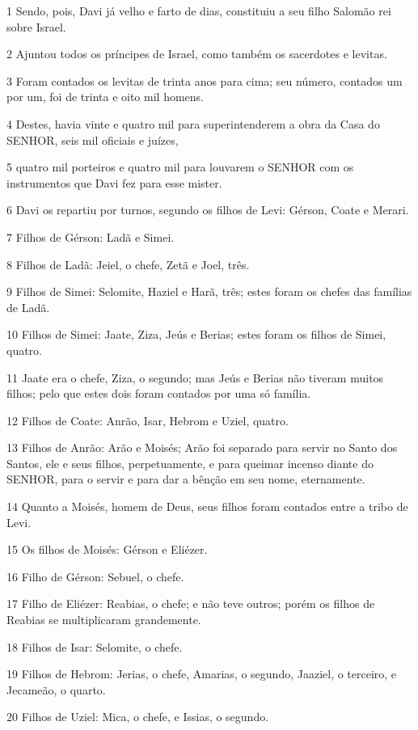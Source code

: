 \par 1 Sendo, pois, Davi já velho e farto de dias, constituiu a seu filho Salomão rei sobre Israel.
\par 2 Ajuntou todos os príncipes de Israel, como também os sacerdotes e levitas.
\par 3 Foram contados os levitas de trinta anos para cima; seu número, contados um por um, foi de trinta e oito mil homens.
\par 4 Destes, havia vinte e quatro mil para superintenderem a obra da Casa do SENHOR, seis mil oficiais e juízes,
\par 5 quatro mil porteiros e quatro mil para louvarem o SENHOR com os instrumentos que Davi fez para esse mister.
\par 6 Davi os repartiu por turnos, segundo os filhos de Levi: Gérson, Coate e Merari.
\par 7 Filhos de Gérson: Ladã e Simei.
\par 8 Filhos de Ladã: Jeiel, o chefe, Zetã e Joel, três.
\par 9 Filhos de Simei: Selomite, Haziel e Harã, três; estes foram os chefes das famílias de Ladã.
\par 10 Filhos de Simei: Jaate, Ziza, Jeús e Berias; estes foram os filhos de Simei, quatro.
\par 11 Jaate era o chefe, Ziza, o segundo; mas Jeús e Berias não tiveram muitos filhos; pelo que estes dois foram contados por uma só família.
\par 12 Filhos de Coate: Anrão, Isar, Hebrom e Uziel, quatro.
\par 13 Filhos de Anrão: Arão e Moisés; Arão foi separado para servir no Santo dos Santos, ele e seus filhos, perpetuamente, e para queimar incenso diante do SENHOR, para o servir e para dar a bênção em seu nome, eternamente.
\par 14 Quanto a Moisés, homem de Deus, seus filhos foram contados entre a tribo de Levi.
\par 15 Os filhos de Moisés: Gérson e Eliézer.
\par 16 Filho de Gérson: Sebuel, o chefe.
\par 17 Filho de Eliézer: Reabias, o chefe; e não teve outros; porém os filhos de Reabias se multiplicaram grandemente.
\par 18 Filhos de Isar: Selomite, o chefe.
\par 19 Filhos de Hebrom: Jerias, o chefe, Amarias, o segundo, Jaaziel, o terceiro, e Jecameão, o quarto.
\par 20 Filhos de Uziel: Mica, o chefe, e Issias, o segundo.
